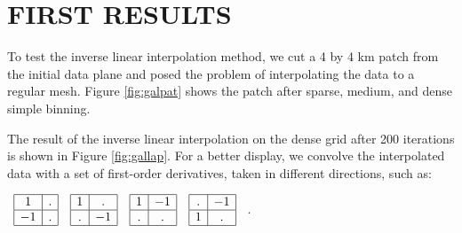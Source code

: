 \section{FIRST RESULTS}

To test the inverse linear interpolation method, we cut a 4 by 4 km patch
from the initial data plane and posed the problem of interpolating the
data to a 
regular mesh. Figure \ref{fig:galpat} shows the patch
after sparse, medium, and dense simple binning.
\par
The result of the inverse linear interpolation on the dense grid after
200 iterations is shown in 
Figure \ref{fig:gallap}. For a better display, we convolve the interpolated
data with a 
set of first-order derivatives, taken in different directions, such as:
\begin{center}
$\begin{array}{cccc}
\begin{array}{|c|c|}
\hline
1 & . \\
\hline
-1 & . \\
\hline
\end{array} &
\begin{array}{|c|c|}
\hline
1 & . \\
\hline
. & -1 \\
\hline
\end{array} &
\begin{array}{|c|c|}
\hline
1 & -1 \\
\hline
. & . \\
\hline
\end{array} &
\begin{array}{|c|c|}
\hline
. & -1 \\
\hline
1 & . \\
\hline
\end{array}
\end{array}
$  .
\end{center}
